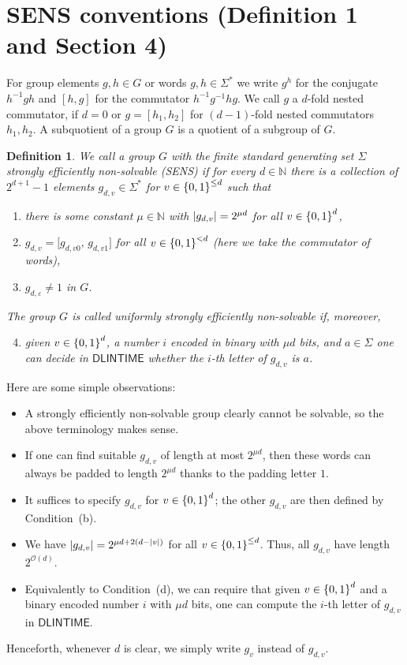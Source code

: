 \documentclass[10pt,a4paper]{article}
\newcommand{\oneset}[1]{\left\{\mathinner{#1}\right\}}
\newcommand{\abs}[1]{\left|\mathinner{#1}\right|}
\newcommand{\N}{\ensuremath{\mathbb N}}
\newcommand{\eps}{\varepsilon}
\newcommand{\Oh}{\mathcal O}
\newcommand{\DLINTIME}{\ensuremath{\mathsf{DLINTIME}}\xspace}
\newtheorem{definition}{Definition}
\begin{document}
\section*{SENS conventions (Definition 1 and Section 4)}
For group elements $g,h\in G$ or words $g,h\in\Sigma^*$ we write $g^h$ for the conjugate $h^{-1}gh$ and $[h,g]$ for the commutator $h^{-1}g^{-1}hg$. We call $g$ a $d$-fold nested commutator, if $d=0$ or $g=[h_1,h_2]$ for $(d-1)$-fold nested commutators $h_1,h_2$. A subquotient of a group $G$ is a quotient of a subgroup of $G$.
\begin{definition}\label{def:SENS}		
  We call a group $G$ with the finite standard generating set $\Sigma$
  \emph{strongly efficiently non-solvable} \emph{(SENS)} if for every
  $d \in \N$ there is a collection of $2^{d+1}-1$ elements
  $g_{d,v} \in \Sigma^*$ for $v \in \oneset{0,1}^{\leq d}$ such that
  \begin{enumerate}[label=(\alph*)]
  \item\label{SENSa} there is some constant $\mu \in \N$ with $\abs{g_{d,v}} = 2^{\mu d}$ for all $v \in \oneset{0,1}^{d}$,
  \item\label{SENSb} $g_{d,v} =	\bigl[ g_{d,v0},\,  g_{d,v1} \bigr]$ for all $v \in \oneset{0,1}^{< d}$ (here we take the commutator of words),
  \item\label{SENSc} $g_{d,\eps} \neq 1$ in $G$.
  \end{enumerate}
   The group $G$ is called \emph{uniformly strongly efficiently
    non-solvable} if, moreover,
  \begin{enumerate}[label=(\alph*)]
    \setcounter{enumi}{3}
  \item\label{SENSu} given $v\in \oneset{0,1}^d$, a number $i$ encoded in binary with $\mu d$ bits, and $a \in \Sigma$ one can decide in $\DLINTIME$ whether the
  	$i$-th letter of $g_{d,v}$ is $a$.
  \end{enumerate} 
\end{definition}
Here are some simple observations:
\begin{itemize}
\item A strongly efficiently non-solvable group clearly cannot
be solvable, so the above terminology makes sense.
\item If one can find suitable $g_{d,v}$ of length at most $2^{\mu d}$,  then these words can always be padded to length $2^{\mu d}$ thanks to the padding letter $1$.
\item  It suffices to specify $g_{d,v}$ for $v \in \oneset{0,1}^{d}$;
  the other $g_{d,v}$ are then defined by Condition~(b).
 \item We have $\abs{g_{d,v}} = 2^{\mu d+ 2(d-\abs{v})}$ for all $v \in \oneset{0,1}^{\leq d}$. Thus, all $g_{d,v}$ have length $2^{\Oh(d)}$.
 \item Equivalently to Condition~(d), we can require that given $v\in \oneset{0,1}^d$ and a binary encoded number $i$ with $\mu d$ bits, one can compute the $i$-th letter of $g_{d,v}$ in $\DLINTIME$.
\end{itemize}
Henceforth, whenever $d$ is clear, we simply write $g_v$ instead of $g_{d,v}$.
\end{document}

